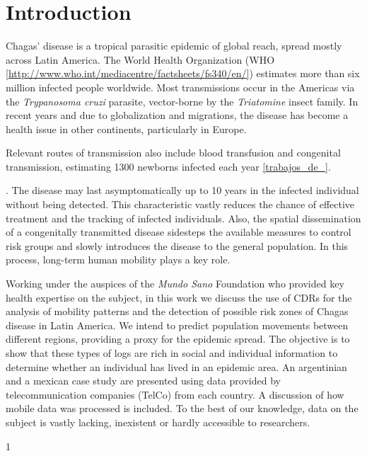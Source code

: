 \section{Introduction}

Chagas' disease is a tropical parasitic epidemic of global reach, spread mostly across Latin America. The World Health Organization (WHO \ref{http://www.who.int/mediacentre/factsheets/fs340/en/}) estimates more than six million infected people worldwide. Most transmissions occur in the Americas via the \textit{Trypanosoma cruzi} parasite, vector-borne by the \textit{Triatomine} insect family. In recent years and due to globalization and migrations, the disease has become a health issue in other continents, particularly in Europe. 

Relevant routes of transmission also include blood transfusion and congenital transmission, estimating 1300 newborns infected each year \ref{trabajos_de_}.\begin{comment}  en el drive estan las ppt del min salud \end{comment}. The disease may last asymptomatically up to 10 years in the infected individual without being detected. This characteristic vastly reduces the chance of effective treatment and the tracking of infected individuals. Also, the spatial dissemination of a congenitally transmitted disease sidesteps the available measures to control risk groups and slowly introduces the disease to the general population. In this process, long-term human mobility plays a key role.

Working under the auspices of the \textit{Mundo Sano} Foundation who provided key health expertise on the subject, in this work we discuss the use of CDRs for the analysis of mobility patterns and the detection of possible risk zones of Chagas disease in Latin America. We intend to predict population movements between different regions, providing a proxy for the epidemic spread. The objective is to show that these types of logs are rich in social and individual information to determine whether an individual has lived in an epidemic area. An argentinian and a mexican case study are presented using data provided by telecommunication companies (TelCo) from each country. A discussion of how mobile data was processed is included. To the best of our knowledge, data on the subject is vastly lacking, inexistent or hardly accessible to researchers. 


1